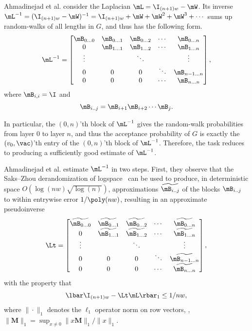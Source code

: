 %
Ahmadinejad  %
et al. consider the Laplacian $\mL = \I_{(n+1)w} - \mW$.  Its
   inverse $\mL^{-1} = (\I_{(n+1)w}-\mW)^{-1} = \I_{(n+1)w}+\mW+\mW^2+\mW^3+\cdots$ sums up random-walks of all lengths in $G$, and thus has the following form. %
   $$\mL^{-1} =
   \begin{bmatrix}
    \mB_{0\ldots0} & \mB_{0\ldots 1} & \mB_{0\ldots 2} & \cdots & \mB_{0\ldots n} \\
    0 & \mB_{1\ldots 1} & \mB_{1\ldots 2} & \cdots & \mB_{1\ldots n} \\
    \vdots & & \ddots & & \vdots\\
    0 & 0 & 0 & \ddots & \mB_{n-1\ldots n}\\
    0 & 0 & 0 & \cdots &  \mB_{n\ldots n} \\
    \end{bmatrix},$$
   where $\mB_{i,i}=\I$ and 
   $$\mB_{i .. j} = \mB_{i+1}\mB_{i+2}\cdots \mB_j.$$
   
   In particular, the $(0,n)$'th block of $\mL^{-1}$ gives the random-walk
   probabilities from layer $0$ to layer $n$, and thus the acceptance probability
   of $G$ is exactly the $(v_0,\vac)$'th entry of the $(0,n)$'th block of $\mL^{-1}$.  Therefore, the task reduces to producing a sufficiently good estimate of $\mL^{-1}$.
   
%
Ahmadinejad  %
et al. estimate $\mL^{-1}$  in two steps.  First, they observe that the Saks--Zhou derandomization of logspace~\cite{SaksZh99} can be used to produce,
   in deterministic space $O(\log(nw)\sqrt{\log(n)})$, %
   approximations %
   $\widetilde{\mB_{i .. j}}$ of the blocks $\mB_{i .. j}$ to within entrywise error $1/\poly(nw)$, resulting in an approximate pseudoinverse
   \begin{equation}
       \Lt =
   \begin{bmatrix}
    \widetilde{\mB_{0\ldots0}} & \widetilde{\mB_{0\ldots 1}} & \widetilde{\mB_{0\ldots 2}} & \cdots & \widetilde{\mB_{0\ldots n}} \\
    0 & \widetilde{\mB_{1\ldots 1}} & \widetilde{\mB_{1\ldots 2}} & \cdots & \widetilde{\mB_{1\ldots n}} \\
    \vdots & & \ddots & & \vdots\\
    0 & 0 & 0 & \ddots & \widetilde{\mB_{n-1\ldots n}}\\
    0 & 0 & 0 & \cdots &  \widetilde{\mB_{n\ldots n}} \\
    \end{bmatrix},\label{eqn:path-inverse}
   \end{equation}
   with the property that
   $$\lbar \I_{(n+1)w}-\Lt \mL\rbar_{1}\leq 1/nw,$$
   where $\|\cdot\|_1$ denotes the $\ell_1$ operator norm on row vectors, \ie, $\|\mathbf{M}\|_1 =\sup_{x\neq 0}\|x\mathbf{M}\|_{1}/\|x\|_{1}$.

